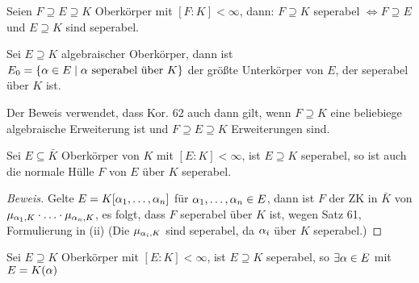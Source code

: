 \documentclass[a4paper]{report}
\begin{document}
\begin{kor}
Seien $F \supseteq E \supseteq K$ Oberkörper mit $[F:K] < \infty$, dann: $F \supseteq K$ seperabel $\iff F \supseteq E$ und $E \supseteq K$ sind seperabel.
\end{kor}

\begin{kor}[Übung] Sei $E \supseteq K$ algebraischer Oberkörper, dann ist $E_{0}= \{\alpha \in E \mid \alpha \text{ seperabel über } K\}$ der größte Unterkörper von $E$, der seperabel über $K$ ist.
\end{kor}
\begin{bem*}
  Der Beweis verwendet, dass Kor. 62 auch dann gilt, wenn $F \supseteq K$ eine beliebiege algebraische Erweiterung ist und $F \supseteq E \supseteq K$ Erweiterungen sind.

\end{bem*}

\begin{kor}
  Sei $E \subseteq \bar K$ Oberkörper von $K$ mit $[E:K] < \infty$, ist $E \supseteq K$ seperabel, so ist auch die normale Hülle $F$ von $E$ über $K$ seperabel.
\begin{proof}[Beweis]
Gelte $E = K[\alpha_{1}, \ldots, \alpha_{n}]$ für $\alpha_{1}, \ldots, \alpha_{n} \in E$, dann ist $F$ der ZK in $\bar K$ von $\mu_{\alpha_{1}, K} \cdot \ldots \cdot \mu_{\alpha_{n}, K}$, es folgt, dass $F$ seperabel über $K$ ist, wegen Satz 61, Formulierung in (ii) (Die $\mu_{\alpha_{i}, K}$ sind seperabel, da $\alpha_{i}$ über $K$ seperabel.)
\end{proof}
\end{kor}


\begin{satz}
Sei $E \supseteq K$ Oberkörper mit $[E:K] < \infty$, ist $E \supseteq K$ seperabel, so $\exists \alpha \in E$ mit $E = K(\alpha)$
\end{satz}
\end{document}
